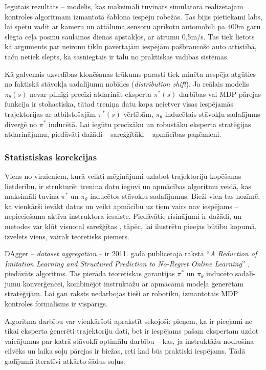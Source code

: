 \documentclass[12pt, a4paper]{article}
\numberwithin{equation}{section} %
\begin{document}
Iegūtais rezultāts -- modelis, kas maksimāli tuvināts simulatorā realizētajam kontroles algoritmam izmantotā šablona iespēju robežās. Tas bijis pietiekami labs, lai spētu vadīt ar kameru un attāluma sensoru aprīkotu automobili pa 400m garu slēgta ceļa posmu saulainos dienas apstākļos, ar ātrumu 0,5m/s. Tas tiek lietots kā arguments par neironu tīklu pavērtajām iespējām pašbraucošo auto attīstībā, taču netiek slēpts, ka sasniegtais ir tālu no praktiskas vadības sistēmas.

Kā galvenais uzvedības klonēšanas trūkums parasti tiek minēta nespēja atgūties no faktiskā stāvokļa sadalījumu nobīdes \cite{attia2018global} (\textit{distribution shift}). Ja reālais modelis $\pi_{\theta}(s)$ nevar pilnīgi precīzi atdarināt eksperta $\pi^*(s)$ darbības vai MDP pārejas funkcija ir stohastiska, tātad treniņa datu kopa neietver visas iespējamās trajektorijas ar atbilstošajām $\pi^*(s)$ vērtībām, $\pi_{\theta}$ inducētais stāvokļu sadalījums diverģē no $\pi^*$ inducētā. Lai iegūtu precīzāku un robustāku eksperta stratēģijas atdarinājumu, piedāvāti dažādi -- sarežģītāki -- apmācības paņēmieni.


\subsubsection{Statistiskas korekcijas}

Viens no virzieniem, kurā veikti mēģinājumi uzlabot trajektoriju kopēšanas lietderību, ir strukturēt treniņa datu ieguvi un apmācības algoritmu veidā, kas maksimāli tuvina $\pi^*$ un $\pi_{\theta}$ inducētos stāvokļu sadalījumus. Bieži vien tas nozīmē, ka vienkārši ievākt datus un veikt apmācību uz tiem vairs nav iespējams -- nepieciešama aktīva instruktora iesaiste. Piedāvātie risinājumi ir dažādi, un metodes var kļūt visnotaļ sarežģītas \cite{attia2018global}, tāpēc, lai ilustrētu pieejas būtību kopumā, izvēlēts viens, vairāk teorētisks piemērs.

DAgger -- \textit{dataset aggregation} -- ir 2011. gadā publicētajā rakstā ``\textit{A Reduction of Imitation Learning and Structured Prediction
to No-Regret Online Learning}'' \cite{ross2011no}, piedāvāts algoritms. Tas pierāda teorētiskas garantijas $\pi^*$ un $\pi_{\theta}$ inducēto sadalī-jumu konverģencei, kombinējot instruktāžu ar apmācāmā modeļa ģenerētām stratēģijām. Lai gan raksts nedarbojas tieši ar robotiku, izmantotais MDP kontroles formālisms ir vispārīgs.

Algoritma darbību var vienkāršoti aprakstīt sekojoši: pieņem, ka ir pieejami ne tikai eksperta ģenerēti trajektoriju dati, bet ir iespējams pašam ekspertam uzdot vaicājumus par katrā stāvoklī optimālu darbību -- kas, ja instruktāžu nodrošina cilvēks un laika soļu pārejas ir biežas, reti kad būs praktiski iespējams. Tādā gadījumā iteratīvi atkārto šādus soļus:
\end{document}
